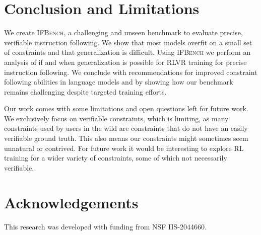 \documentclass{article}
\newcommand{\benchname}{\textsc{IFBench}\xspace}
\begin{document}
\section{Conclusion and Limitations}
We create \benchname, a challenging and unseen benchmark to evaluate precise, verifiable instruction following. We show that most models overfit on a small set of constraints and that generalization is difficult. Using \benchname we perform an analysis of if and when generalization is possible for RLVR training for precise instruction following. We conclude with recommendations for improved constraint following abilities in language models and by showing how our benchmark remains challenging despite targeted training efforts.

Our work comes with some limitations and open questions left for future work. We exclusively focus on verifiable constraints, which is limiting, as many constraints used by users in the wild are constraints that do not have an easily verifiable ground truth. This also means our constraints might sometimes seem unnatural or contrived. For future work it would be interesting to explore RL training for a wider variety of constraints, some of which not necessarily verifiable.

\section*{Acknowledgements}
This research was developed with funding from NSF IIS-2044660.





\appendix


\end{document}
